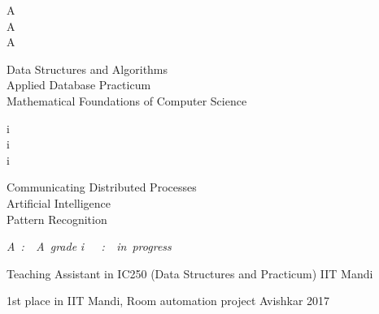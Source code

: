 \documentclass[]{awesome-cv}
\begin{document}
\vspace{-3mm}

\vspace{-5mm}
\begin{cvhonors}
	\begin{minipage}[t]{0.05\textwidth}
		A\\
		A\\
		A
	\end{minipage}\begin{minipage}[t]{0.45\textwidth}
		 Data Structures and Algorithms\\	
		 Applied Database Practicum\\	
		 Mathematical Foundations of Computer Science	
	\end{minipage}\begin{minipage}[t]{0.05\textwidth}
		i\\
		i\\
		i
	\end{minipage}\begin{minipage}[t]{0.45\textwidth}
		Communicating Distributed Processes\\
		Artificial Intelligence\\	
		Pattern Recognition\\	
	\end{minipage}	

\color[HTML]{b30000}
\textit{A~:~~A~grade }
\textit{i~~~:~~in~progress}  
	
\end{cvhonors}




\vspace{-5mm}
\begin{cventries}
	\cventry
	{Teaching Assistant in IC250 (Data Structures and Practicum)}
	{IIT Mandi}
	{}
	{}
	{}	
\end{cventries}
\vspace{-5mm}
\begin{cventries}
	\cventry
	{1st place in IIT Mandi, Room automation project}
	{Avishkar 2017}
	{}
	{}
	{}	
\end{cventries}


\ 
\end{document}
